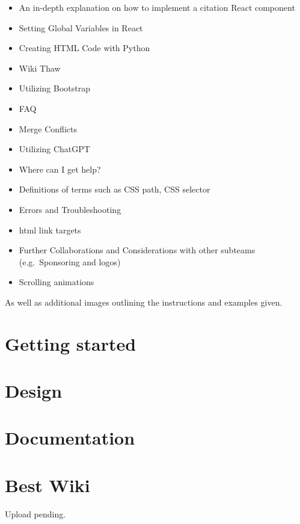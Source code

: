 \documentclass[a4paper, 11pt, twoside]{book}
\begin{document}
\begin{itemize}
    \item An in-depth explanation on how to implement a citation React component
    \item Setting Global Variables in React
    \item Creating HTML Code with Python
    \item Wiki Thaw
    \item Utilizing Bootstrap
    \item FAQ
    \item Merge Conflicts
    \item Utilizing ChatGPT
    \item Where can I get help?
    \item Definitions of terms such as CSS path, CSS selector
    \item Errors and Troubleshooting
    \item html link targets
    \item Further Collaborations and Considerations with other subteams (e.g.\ Sponsoring and logos)
    \item Scrolling animations
\end{itemize}
As well as additional images outlining the instructions and examples given.
\newpage

\mainmatter
\pagecolor{pgcolor}
\chapter{Getting started} \label{ch:started}

\newpage
\chapter{Design} \label{ch:design}

\newpage
\chapter{Documentation} \label{ch:docu}

\newpage
%
\chapter{Best Wiki} \label{ch:bestwiki}
%
Upload pending.
\newpage
\end{document}
